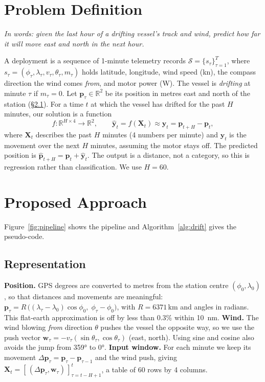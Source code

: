 \documentclass[sigconf]{acmart}
\begin{document}
\section{Problem Definition}\label{sec:problem}
\emph{In words: given the last hour of a drifting vessel's track and wind, predict how far it will move east and north in the next hour.}

A deployment is a sequence of 1-minute telemetry records $\mathcal{S}=\{s_\tau\}_{\tau=1}^{T}$, where $s_\tau=(\phi_\tau,\lambda_\tau,v_\tau,\theta_\tau,m_\tau)$ holds latitude, longitude, wind speed (kn), the compass direction the wind comes \emph{from}, and motor power (W). The vessel is \emph{drifting} at minute $\tau$ if $m_\tau=0$. Let $\mathbf{p}_\tau\in\mathbb{R}^2$ be its position in metres east and north of the station (\S\ref{sec:repr}). For a time $t$ at which the vessel has drifted for the past $H$ minutes, our solution is a function
\begin{equation}\label{eq:f}
f:\mathbb{R}^{H\times 4}\rightarrow\mathbb{R}^{2},\qquad \hat{\mathbf{y}}_t=f(\mathbf{X}_t)\approx\mathbf{y}_t=\mathbf{p}_{t+H}-\mathbf{p}_t,
\end{equation}
where $\mathbf{X}_t$ describes the past $H$ minutes (4 numbers per minute) and $\mathbf{y}_t$ is the movement over the next $H$ minutes, assuming the motor stays off. The predicted position is $\hat{\mathbf{p}}_{t+H}=\mathbf{p}_t+\hat{\mathbf{y}}_t$. The output is a distance, not a category, so this is regression rather than classification. We use $H=60$.

\section{Proposed Approach}\label{sec:approach}
Figure~\ref{fig:pipeline} shows the pipeline and Algorithm~\ref{alg:drift} gives the pseudo-code.

\subsection{Representation}\label{sec:repr}
\textbf{Position.} GPS degrees are converted to metres from the station centre $(\phi_0,\lambda_0)$, so that distances and movements are meaningful: $\mathbf{p}_\tau=R\,\big((\lambda_\tau-\lambda_0)\cos\phi_0,\;\phi_\tau-\phi_0\big)$, with $R=6371$\,km and angles in radians. This flat-earth approximation is off by less than 0.3\% within 10~nm.
\textbf{Wind.} The wind blowing \emph{from} direction $\theta$ pushes the vessel the opposite way, so we use the push vector $\mathbf{w}_\tau=-v_\tau(\sin\theta_\tau,\cos\theta_\tau)$ (east, north). Using sine and cosine also avoids the jump from 359° to 0°.
\textbf{Input window.} For each minute we keep its movement $\Delta\mathbf{p}_\tau=\mathbf{p}_\tau-\mathbf{p}_{\tau-1}$ and the wind push, giving
$\mathbf{X}_t=[\,(\Delta\mathbf{p}_\tau,\mathbf{w}_\tau)\,]_{\tau=t-H+1}^{t}$, a table of 60 rows by 4 columns.
\end{document}
